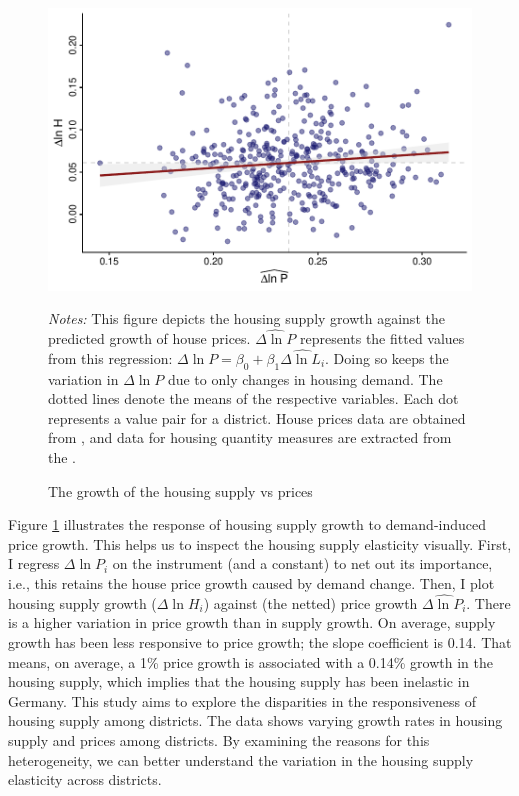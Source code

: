 \documentclass[
  12pt,
]{article}
\begin{document}
\begin{figure}[H]
\centering

\begin{center}\includegraphics{output/figs/quantity-vs-price-netted-out-1} \end{center}

\caption{The growth of the housing supply vs prices}\label{fig:quantity-vs-price-netted-out}
\medskip
\begin{minipage}{0.9\textwidth}
\footnotesize
\textit{Notes:} This figure depicts the housing supply growth against the predicted growth of house prices. $\widehat{\Delta\ln P}$ represents the fitted values from this regression: $\Delta\ln P = \beta_0 + \beta_1\widehat{\Delta\ln L_i}$. Doing so keeps the variation in $\Delta\ln P$ due to only changes in housing demand. The dotted lines denote the means of the respective variables. Each dot represents a value pair for a district. House prices data are obtained from \citet{rwi2020}, and data for housing quantity measures are extracted from the \citet{atlasde2022}.
\end{minipage}
\end{figure}

Figure \ref{fig:quantity-vs-price-netted-out} illustrates the response of housing supply growth to demand-induced price growth. This helps us to inspect the housing supply elasticity visually. First, I regress \(\Delta \ln P_i\) on the instrument (and a constant) to net out its importance, i.e., this retains the house price growth caused by demand change. Then, I plot housing supply growth (\(\Delta\ln H_i\)) against (the netted) price growth \(\widehat{\Delta\ln P_i}\). There is a higher variation in price growth than in supply growth. On average, supply growth has been less responsive to price growth; the slope coefficient is 0.14. That means, on average, a 1\% price growth is associated with a 0.14\% growth in the housing supply, which implies that the housing supply has been inelastic in Germany. This study aims to explore the disparities in the responsiveness of housing supply among districts. The data shows varying growth rates in housing supply and prices among districts. By examining the reasons for this heterogeneity, we can better understand the variation in the housing supply elasticity across districts.
\end{document}

